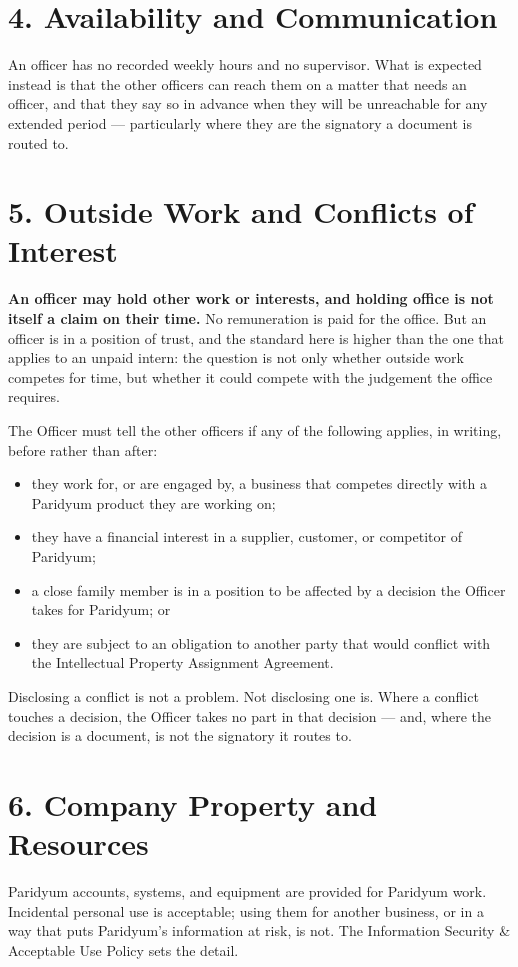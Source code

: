 \documentclass{paridyum}
\begin{document}
\section*{4. Availability and Communication}
An officer has no recorded weekly hours and no supervisor. What is expected instead is
that the other officers can reach them on a matter that needs an officer, and that they
say so in advance when they will be unreachable for any extended period --- particularly
where they are the signatory a document is routed to.

\section*{5. Outside Work and Conflicts of Interest}
\textbf{An officer may hold other work or interests, and holding office is not itself a
claim on their time.} No remuneration is paid for the office. But an officer is in a
position of trust, and the standard here is higher than the one that applies to an unpaid
intern: the question is not only whether outside work competes for time, but whether it
could compete with the judgement the office requires.

The Officer must tell the other officers if any of the following applies, in writing,
before rather than after:
\begin{itemize}[leftmargin=*, noitemsep]
    \item they work for, or are engaged by, a business that competes directly
          with a Paridyum product they are working on;
    \item they have a financial interest in a supplier, customer, or
          competitor of Paridyum;
    \item a close family member is in a position to be affected by a decision
          the Officer takes for Paridyum; or
    \item they are subject to an obligation to another party that would
          conflict with the Intellectual Property Assignment Agreement.
\end{itemize}
Disclosing a conflict is not a problem. Not disclosing one is. Where a conflict touches a
decision, the Officer takes no part in that decision --- and, where the decision is a
document, is not the signatory it routes to.

\section*{6. Company Property and Resources}
Paridyum accounts, systems, and equipment are provided for Paridyum work.
Incidental personal use is acceptable; using them for another business, or in a
way that puts Paridyum's information at risk, is not. The Information Security
\& Acceptable Use Policy sets the detail.
\end{document}
